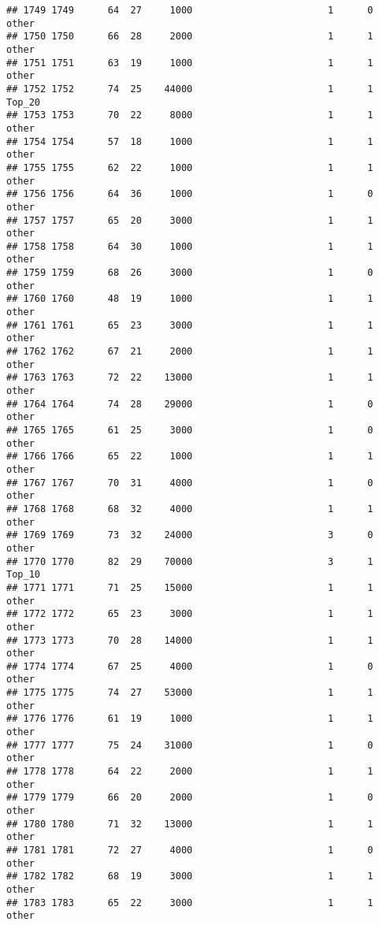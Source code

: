 \documentclass[
]{article}
\begin{document}
\begin{verbatim}
## 1749 1749      64  27     1000                        1      0    other
## 1750 1750      66  28     2000                        1      1    other
## 1751 1751      63  19     1000                        1      1    other
## 1752 1752      74  25    44000                        1      1   Top_20
## 1753 1753      70  22     8000                        1      1    other
## 1754 1754      57  18     1000                        1      1    other
## 1755 1755      62  22     1000                        1      1    other
## 1756 1756      64  36     1000                        1      0    other
## 1757 1757      65  20     3000                        1      1    other
## 1758 1758      64  30     1000                        1      1    other
## 1759 1759      68  26     3000                        1      0    other
## 1760 1760      48  19     1000                        1      1    other
## 1761 1761      65  23     3000                        1      1    other
## 1762 1762      67  21     2000                        1      1    other
## 1763 1763      72  22    13000                        1      1    other
## 1764 1764      74  28    29000                        1      0    other
## 1765 1765      61  25     3000                        1      0    other
## 1766 1766      65  22     1000                        1      1    other
## 1767 1767      70  31     4000                        1      0    other
## 1768 1768      68  32     4000                        1      1    other
## 1769 1769      73  32    24000                        3      0    other
## 1770 1770      82  29    70000                        3      1   Top_10
## 1771 1771      71  25    15000                        1      1    other
## 1772 1772      65  23     3000                        1      1    other
## 1773 1773      70  28    14000                        1      1    other
## 1774 1774      67  25     4000                        1      0    other
## 1775 1775      74  27    53000                        1      1    other
## 1776 1776      61  19     1000                        1      1    other
## 1777 1777      75  24    31000                        1      0    other
## 1778 1778      64  22     2000                        1      1    other
## 1779 1779      66  20     2000                        1      0    other
## 1780 1780      71  32    13000                        1      1    other
## 1781 1781      72  27     4000                        1      0    other
## 1782 1782      68  19     3000                        1      1    other
## 1783 1783      65  22     3000                        1      1    other

\end{verbatim}
\end{document}
